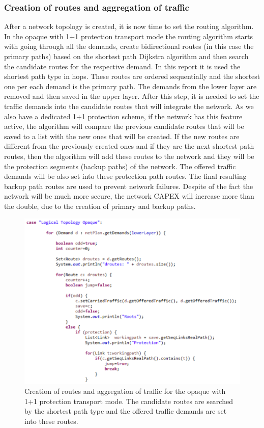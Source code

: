 \subsubsection{Creation of routes and aggregation of traffic}

\vspace{11pt}
After a network topology is created, it is now time to set the routing algorithm. In the opaque with 1+1 protection transport mode the routing algorithm starts with going through all the demands, create bidirectional routes (in this case the primary paths) based on the shortest path Dijkstra algorithm and then search the candidate routes for the respective demand. In this report it is used the shortest path type in hops. These routes are ordered sequentially and the shortest one per each demand is the primary path. The demands from the lower layer are removed and then saved in the upper layer. After this step, it is needed to set the traffic demands into the candidate routes that will integrate the network.
As we also have a dedicated 1+1 protection scheme, if the network has this feature active, the algorithm will compare the previous candidate routes that will be saved to a list with the new ones that will be created. If the new routes are different from the previously created ones and if they are the next shortest path routes, then the algorithm will add these routes to the network and they will be the protection segments (backup paths) of the network. The offered traffic demands will be also set into these protection path routes. The final resulting backup path routes are used to prevent network failures. Despite of the fact the network will be much more secure, the network CAPEX will increase more than the double, due to the creation of primary and backup paths.

\begin{figure}[H]
\centering
\includegraphics[width=14cm]{sdf/heuristic/opaque_protection/figures/grooming_opaque_protec1}
\caption{Creation of routes and aggregation of traffic for the opaque with 1+1 protection transport mode. The candidate routes are searched by the shortest path type and the offered traffic demands are set into these routes.}
\label{grooming_opaque_protec1}
\end{figure}

